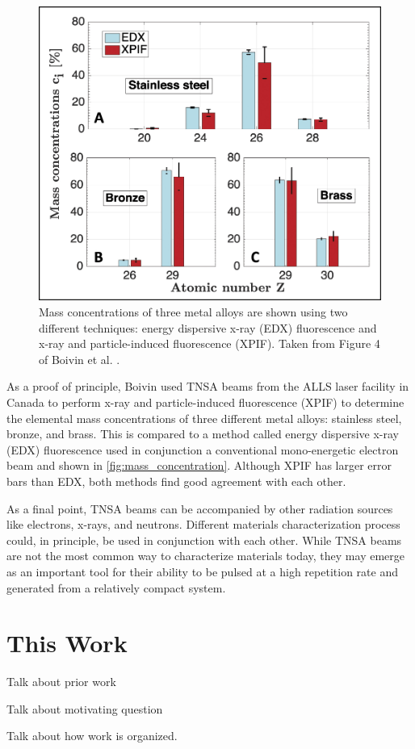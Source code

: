 \begin{figure}
	\centering
	\includegraphics[width=0.6\linewidth]{planning/images/mass_concentration.jpg}
	\caption{Mass concentrations of three metal alloys are shown using two different techniques: energy dispersive x-ray (EDX) fluorescence and x-ray and particle-induced fluorescence (XPIF). Taken from Figure 4 of Boivin et al. \cite{Boivin_2022_NJoP}.}
	\label{fig:mass_concentration}
\end{figure}

As a proof of principle, Boivin \cite{Boivin_2022_NJoP} used TNSA beams from the ALLS laser facility in Canada to perform x-ray and particle-induced fluorescence (XPIF) to determine the elemental mass concentrations of three different metal alloys: stainless steel, bronze, and  brass. This is compared to a method called energy dispersive x-ray (EDX) fluorescence used in conjunction a conventional mono-energetic electron beam and shown in \autoref{fig:mass_concentration}. Although XPIF has larger error bars than EDX, both methods find good agreement with each other.

As a final point, TNSA beams can be accompanied by other radiation sources like electrons, x-rays, and neutrons. Different materials characterization process could, in principle, be used in conjunction with each other. While TNSA beams are not the most common way to characterize materials today, they may emerge as an important tool for their ability to be pulsed at a high repetition rate and generated from a relatively compact system.

\section{This Work}
Talk about prior work 


Talk about motivating question 


Talk about how work is organized. 


